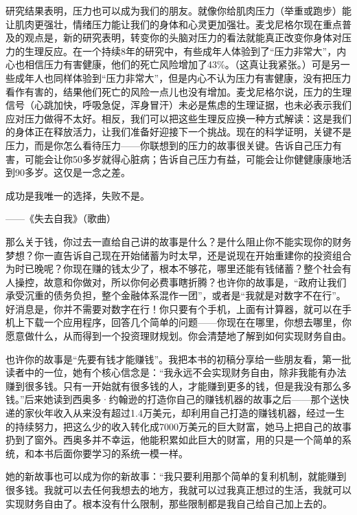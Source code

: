 研究结果表明，压力也可以成为我们的朋友。就像你给肌肉压力（举重或跑步）能让肌肉更强壮，情绪压力能让我们的身体和心灵更加强壮。麦戈尼格尔现在重点普及的观点是，新的研究表明，转变你的头脑对压力的看法就能真正改变你身体对压力的生理反应。在一个持续8年的研究中，有些成年人体验到了“压力非常大”，内心也相信压力有害健康，他们的死亡风险增加了43\%。（这真让我紧张。）可是另一些成年人也同样体验到“压力非常大”，但是内心不认为压力有害健康，没有把压力看作有害的，结果他们死亡的风险一点儿也没有增加。麦戈尼格尔说，压力的生理信号（心跳加快，呼吸急促，浑身冒汗）未必是焦虑的生理证据，也未必表示我们应对压力做得不太好。相反，我们可以把这些生理反应换一种方式解读：这是我们的身体正在释放活力，让我们准备好迎接下一个挑战。现在的科学证明，关键不是压力，而是你怎么看待压力——你联想到的压力的故事很关键。告诉自己压力有害，可能会让你50多岁就得心脏病；告诉自己压力有益，可能会让你健健康康地活到90多岁。这仅是一念之差。

\begin{BookQuote}
成功是我唯一的选择，失败不是。

\hfill ——《失去自我》（歌曲）
\end{BookQuote}

那么关于钱，你过去一直给自己讲的故事是什么？是什么阻止你不能实现你的财务梦想？你一直告诉自己现在开始储蓄为时太早，还是说现在开始重建你的投资组合为时已晚呢？你现在赚的钱太少了，根本不够花，哪里还能有钱储蓄？整个社会有人操控，故意和你做对，所以你何必费事瞎折腾？也许你的故事是，“政府让我们承受沉重的债务负担，整个金融体系混作一团”，或者是“我就是对数字不在行”。好消息是，你并不需要对数字在行！你只要有个手机，上面有计算器，就可以在手机上下载一个应用程序，回答几个简单的问题——你现在在哪里，你想去哪里，你愿意做什么，从而得到一个投资理财规划。你会清楚地了解到如何实现财务自由。

也许你的故事是“先要有钱才能赚钱”。我把本书的初稿分享给一些朋友看，第一批读者中的一位，她有个核心信念是：“我永远不会实现财务自由，除非我能有办法赚到很多钱。只有一开始就有很多钱的人，才能赚到更多的钱，但是我没有那么多钱。”后来她读到西奥多·约翰逊的打造你自己的赚钱机器的故事之后——那个送快递的家伙年收入从来没有超过1.4万美元，却利用自己打造的赚钱机器，经过一生的持续努力，把这么少的收入转化成7000万美元的巨大财富，她马上把自己的故事扔到了窗外。西奥多并不幸运，他能积累如此巨大的财富，用的只是一个简单的系统，和本书后面你要学习的系统一模一样。

她的新故事也可以成为你的新故事：“我只要利用那个简单的复利机制，就能赚到很多钱。我就可以去任何我想去的地方，我就可以过我真正想过的生活，我就可以实现财务自由了。根本没有什么限制，那些限制都是我自己给自己加上去的。

